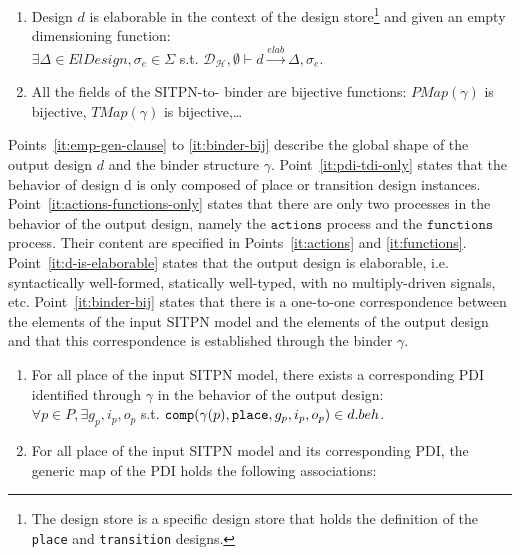 \begin{definition}
\begin{enumerate}
  \item\label{it:d-is-elaborable} Design $d$ is elaborable in the context of the \hilecop{} design store\footnote{The \hilecop{} design store is a specific design store that holds the definition of the \texttt{place} and \texttt{transition} designs.} and given an empty dimensioning function:\\
    $\exists{}\Delta\in{}ElDesign,\sigma_e\in\Sigma$ s.t.
    $\mathcal{D_\mathcal{H}},\emptyset\vdash{}d\xrightarrow{elab}\Delta,\sigma_e$.
    
  \item\label{it:binder-bij} All the fields of the SITPN-to-\hvhdl{} binder are bijective
    functions: $PMap(\gamma)$ is bijective, $TMap(\gamma)$ is
    bijective,\dots
  \end{enumerate}

  \bigskip
  
  Points~\ref{it:emp-gen-clause} to \ref{it:binder-bij} describe the
  global shape of the output design $d$ and the binder structure
  $\gamma$.  Point~\ref{it:pdi-tdi-only} states that the behavior of
  design d is only composed of place or transition design
  instances. Point~\ref{it:actions-functions-only} states that there
  are only two processes in the behavior of the output design, namely
  the $\mathtt{actions}$ process and the $\mathtt{functions}$
  process. Their content are specified in Points~\ref{it:actions} and
  \ref{it:functions}. Point~\ref{it:d-is-elaborable} states that the
  output design is elaborable, i.e. syntactically well-formed,
  statically well-typed, with no multiply-driven signals, etc.
  Point~\ref{it:binder-bij} states that there is a one-to-one
  correspondence between the elements of the input SITPN model and the
  elements of the output design and that this correspondence is
  established through the binder $\gamma$.

  \bigskip
  
  \begin{enumerate}[resume]
  \item\label{it:pdi-exists} For all place of the input SITPN model,
    there exists a corresponding PDI identified through $\gamma$ in
    the behavior of the output
    design:\\
    $\forall{}p\in{}P,\exists{}g_p,i_p,o_p$ s.t.  $\mathtt{comp}(\gamma(p),\mathtt{place},g_p,i_p,o_p)\in{}d.beh$.
    
  \item\label{it:pdi-gmap} For all place of the input SITPN model and
    its corresponding PDI, the generic map of the PDI holds the
    following associations:
    

\end{enumerate}
\end{definition}
